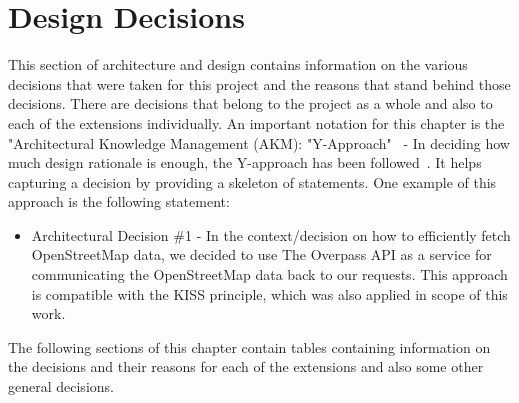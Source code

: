 \section{Design Decisions}
This section of architecture and design contains information on the various decisions that were taken for this project and the reasons that stand behind those decisions.
There are decisions that belong to the project as a whole and also to each of the extensions individually.
\newline
An important notation for this chapter is the "Architectural Knowledge Management (AKM): "Y-Approach"~\cite{AKMHomepage} - In deciding how much design rationale is enough, the Y-approach has been followed~\cite{YApproach}. It helps capturing a decision by providing a skeleton of statements. One example of this approach is the following statement:
\begin{itemize}
	\item Architectural Decision \#1 - In the context/decision on how to efficiently fetch OpenStreetMap data, we decided to use The Overpass API as a service for communicating the OpenStreetMap data back to our requests. This approach is compatible with the KISS principle, which was also applied in scope of this work.
\end{itemize}
The following sections of this chapter contain tables containing information on the decisions and their reasons for each of the extensions and also some other general decisions.
\pagebreak
